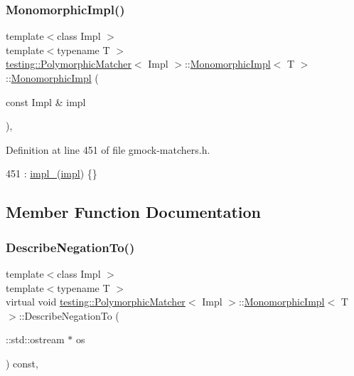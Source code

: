\subsubsection{\texorpdfstring{Monomorphic\+Impl()}{MonomorphicImpl()}}
{\footnotesize\ttfamily template$<$class Impl $>$ \\
template$<$typename T $>$ \\
\hyperlink{classtesting_1_1PolymorphicMatcher}{testing\+::\+Polymorphic\+Matcher}$<$ Impl $>$\+::\hyperlink{classtesting_1_1PolymorphicMatcher_1_1MonomorphicImpl}{Monomorphic\+Impl}$<$ T $>$\+::\hyperlink{classtesting_1_1PolymorphicMatcher_1_1MonomorphicImpl}{Monomorphic\+Impl} (\begin{DoxyParamCaption}\item[{const Impl \&}]{impl }\end{DoxyParamCaption})\hspace{0.3cm}{\ttfamily [inline]}, {\ttfamily [explicit]}}



Definition at line 451 of file gmock-\/matchers.\+h.


\begin{DoxyCode}
451 : \hyperlink{classtesting_1_1PolymorphicMatcher_1_1MonomorphicImpl_af444d0e547c2f5b0a5e553868c042330}{impl\_}(\hyperlink{classtesting_1_1PolymorphicMatcher_ab10e4858d8dc903d3e1e378d53d25882}{impl}) \{\}
\end{DoxyCode}


\subsection{Member Function Documentation}
\mbox{\label{classtesting_1_1PolymorphicMatcher_1_1MonomorphicImpl_a699910683db97c94f23da3e131604e76}} 
\subsubsection{\texorpdfstring{Describe\+Negation\+To()}{DescribeNegationTo()}}
{\footnotesize\ttfamily template$<$class Impl $>$ \\
template$<$typename T $>$ \\
virtual void \hyperlink{classtesting_1_1PolymorphicMatcher}{testing\+::\+Polymorphic\+Matcher}$<$ Impl $>$\+::\hyperlink{classtesting_1_1PolymorphicMatcher_1_1MonomorphicImpl}{Monomorphic\+Impl}$<$ T $>$\+::Describe\+Negation\+To (\begin{DoxyParamCaption}\item[{\+::std\+::ostream $\ast$}]{os }\end{DoxyParamCaption}) const\hspace{0.3cm}{\ttfamily [inline]}, {\ttfamily [virtual]}}



